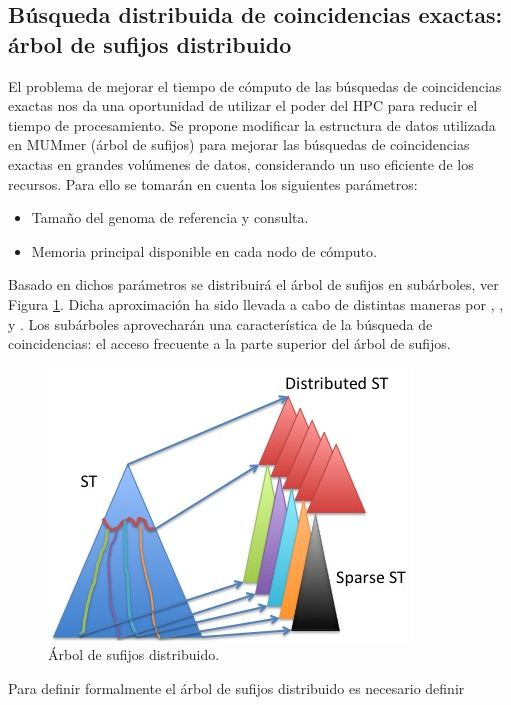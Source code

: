 \documentclass[12pt,a4paper]{article}
\begin{document}
\subsection{Búsqueda distribuida de coincidencias exactas: árbol de sufijos distribuido}
El problema de mejorar el tiempo de cómputo de las búsquedas de coincidencias 
exactas nos da una oportunidad de utilizar el poder del HPC para reducir el
tiempo de procesamiento. Se propone modificar la estructura de datos utilizada en 
MUMmer (árbol de sufijos) para mejorar las búsquedas de coincidencias exactas en 
grandes volúmenes de datos, considerando un uso eficiente de los recursos. Para 
ello se tomarán en cuenta los siguientes parámetros: 
\begin{itemize}
\item Tamaño del genoma de referencia y consulta.
\item Memoria principal disponible en cada nodo de cómputo.
\end{itemize}
Basado en dichos parámetros se distribuirá el árbol de sufijos en subárboles, 
ver Figura \ref{fig:estructura}. Dicha aproximación ha sido llevada a cabo de distintas maneras por \cite{Mansour2012}, 
\cite{Japp2004}, \cite{Ghoting2010} y \cite{Sadakane}.
 Los subárboles aprovecharán una característica
de la búsqueda de coincidencias: el acceso frecuente a la parte superior del 
árbol de sufijos.\\ 
\begin{figure}[h]
\begin{center}
\includegraphics[scale=0.8]{distributed.png}
\caption{Árbol de sufijos distribuido.}
\label{fig:estructura}
\end{center}
\end{figure}
Para definir formalmente el árbol de sufijos distribuido es necesario definir 
\end{document}
